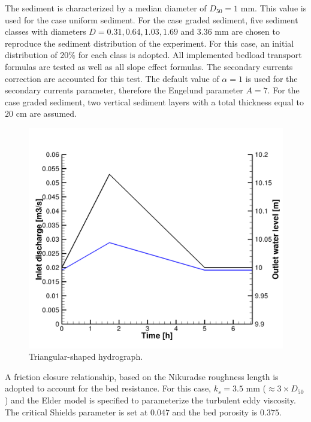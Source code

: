 The sediment is characterized by a median diameter of $D_{50}=1$ mm. This value is used for the case uniform sediment.
For the case graded sediment, five sediment classes with diameters $D=0.31, 0.64, 1.03, 1.69$ and $3.36$ mm are chosen to
reproduce the sediment distribution of the experiment. For this case, an initial distribution of 20\% for each class is adopted.
All implemented bedload transport formulas are tested as well as all slope effect formulas. The secondary currents correction are accounted for this test.
The default value of $\alpha=1$ is used for the secondary currents parameter, therefore the Engelund parameter $A=7$.
For the case graded sediment, two vertical sediment layers with a total thickness equal to $20$ cm are assumed.

\begin{figure}[!h]
\centering
\includegraphics[scale=0.1]{img/yen_boundaries.png}
 \caption{Triangular-shaped hydrograph.}\label{fig:hydro}
\end{figure}

A friction closure relationship, based on the Nikuradse roughness length is adopted to
account for the bed resistance. For this case, $k_s=3.5$ mm ($\approx 3\times D_{50}$) and the Elder model is specified to parameterize the turbulent eddy viscosity.
The critical Shields parameter is set at $0.047$ and the bed porosity is $0.375$.


%
%
